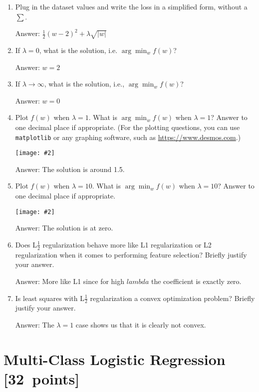 \documentclass{article}
\newcommand{\blu}[1]{{\textcolor{blu}{#1}}}
\newenvironment{answer}{\par\begingroup\color{gre}Answer: }{\endgroup}
\let\ask\blu
\newcommand\pts[1]{\textcolor{pointscolour}{[#1~points]}}
\newcommand{\centerfig}[2]{\begin{center}\texttt{[image: \#2]}\end{center}}
\begin{document}
\begin{enumerate}
\item \ask{Plug in the dataset values and write the loss in a simplified form, without a $\sum$.}
\begin{answer}
    $\frac{1}{2} (w-2)^2  + \lambda \sqrt{|w|}$
\end{answer}
\item \ask{If $\lambda=0$, what is the solution, i.e. $\arg \min_w f(w)$?}
\begin{answer}
    $w = 2$
\end{answer}
\item \ask{If $\lambda\rightarrow \infty$, what is the solution, i.e., $\arg \min_w f(w)$?}
\begin{answer}
    $w = 0$
\end{answer}
\item \ask{Plot $f(w)$ when $\lambda = 1$. What is $\arg \min_w f(w)$ when $\lambda=1$?} Answer to one decimal place if appropriate. (For the plotting questions, you can use \texttt{matplotlib} or any graphing software, such as \url{https://www.desmos.com}.)
\centerfig{.7}{./desmos-graph1.png}
\begin{answer}
    The solution is around 1.5.
\end{answer}
\item \ask{Plot $f(w)$ when $\lambda = 10$. What is $\arg \min_w f(w)$ when $\lambda=10$?} Answer to one decimal place if appropriate.
\centerfig{.7}{./desmos-graph.png}
\begin{answer}
    The solution is at zero.
\end{answer}

\item \ask{Does L$\frac12$ regularization behave more like L1 regularization or L2 regularization
when it comes to performing feature selection?} Briefly justify your answer.
\begin{answer}
    More like L1 since for high $lambda$ the coefficient is exactly zero.
\end{answer}
\item \ask{Is least squares with L$\frac12$ regularization
a convex optimization problem?} Briefly justify your answer.
\begin{answer}
    The $\lambda = 1$ case shows us that it is clearly not convex.
\end{answer}
\end{enumerate}




\clearpage
\section{Multi-Class Logistic Regression \pts{32}}
\end{document}
